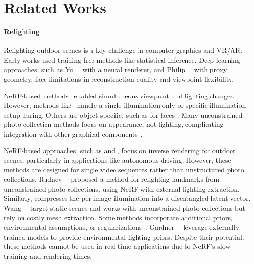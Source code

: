 
\section{Related Works}
  \label{sec:lumigauss-related_works}

  \paragraph{Relighting}
    Relighting outdoor scenes is a key challenge in computer graphics and VR/AR.
    Early works \cite{lalonde2009webcam, troccoli2005relighting,
      haber2009relighting, xing2013lighting, sunkavalli2007factored,
      duchene2015multi, barron2014shape} used training-free methods like statistical
    inference.
    Deep learning approaches, such as Yu~\etal~\cite{yu2020self} with a neural
    renderer, and Philip~\etal~\cite{philip2019multi} with proxy geometry, face
    limitations in reconstruction quality and viewpoint flexibility.

    NeRF-based methods~\cite{mildenhall2020nerf} enabled simultaneous viewpoint
    and lighting changes.
    However, methods like~\cite{zhang2021nerfactor, zeng2023nrhints,
      srinivasan2021nerv} handle a single illumination only or specific illumination
    setup during.
    Others are object-specific, such as for faces \cite{sun2021nelf}.
    Many unconstrained photo collection methods focus on appearance, not lighting,
    complicating integration with other graphical
    components~\cite{martin2021nerfw, chen2022hallucinated, yang2023crnerf,
      li2023msnerf}.

    NeRF-based approaches, such as \cite{pun2023lightsim} and \cite{urbanir},
    focus on inverse rendering for outdoor scenes, particularly in applications
    like autonomous driving.
    However, these methods are designed for single video sequences rather than
    unstructured photo collections.
    Rudnev~\etal~\cite{rudnev2022nerfosr} proposed a method for relighting
    landmarks from unconstrained photo collections, using NeRF with external
    lighting extraction.
    Similarly, \cite{li2022neulighting} compresses the per-image illumination into
    a disentangled latent vector.
    Wang~\etal~\cite{wang2023fegr} target static scenes and works with
    unconstrained photo collections but rely on costly mesh extraction.
    Some methods incorporate additional priors, environmental assumptions, or
    regularizations~\cite{solnerf, yang2023complementary}.
    Gardner~\etal~\cite{gardner2023neusky} leverage externally trained models to
    provide environmental lighting priors.
    Despite their potential, these methods cannot be used in real-time
    applications due to NeRF’s slow training and rendering times.

